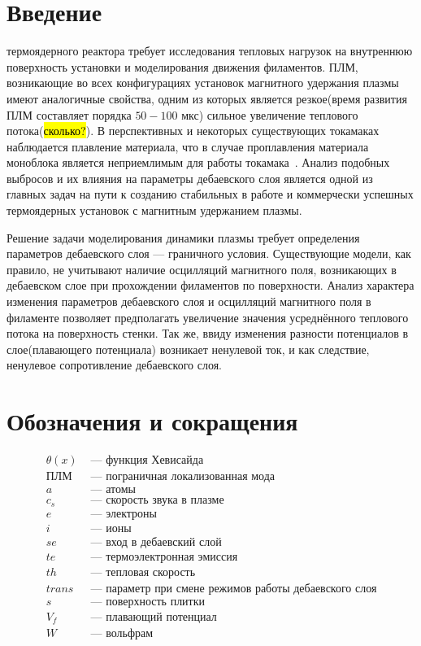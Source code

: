 \section{Введение}
 термоядерного реактора требует исследования тепловых нагрузок на
внутреннюю поверхность установки и моделирования движения филаментов. ПЛМ,
возникающие во всех конфигурациях установок магнитного удержания плазмы имеют
аналогичные свойства, одним из которых является резкое(время развития ПЛМ
составляет порядка $50-100$ мкс) сильное увеличение теплового
потока(\hl{сколько?}). В перспективных и некоторых существующих токамаках
наблюдается плавление материала, что в случае проплавления материала моноблока
является неприемлимым для работы токамака~\cite{gunn2017surface}. Анализ
подобных выбросов и их влияния на параметры дебаевского слоя является одной из
главных задач на пути к созданию стабильных в работе и коммерчески успешных
термоядерных установок с магнитным удержанием плазмы.

Решение задачи моделирования динамики плазмы требует определения параметров
дебаевского слоя --- граничного условия. Существующие модели, как правило, не
учитывают наличие осцилляций магнитного поля, возникающих в дебаевском слое при
прохождении филаментов по поверхности. Анализ характера изменения параметров
дебаевского слоя и осцилляций магнитного поля в филаменте позволяет предполагать
увеличение значения усреднённого теплового потока на поверхность стенки. Так же,
ввиду изменения разности потенциалов в слое(плавающего потенциала) возникает
ненулевой ток, и как следствие, ненулевое сопротивление дебаевского слоя.
\pagebreak

\section{Обозначения и сокращения}
\begin{align*}
	\theta(x) &\text{ --- функция Хевисайда}\\
	\text{ПЛМ} &\text{ --- пограничная локализованная мода}\\
	a &\text{ --- атомы}\\
	c_s &\text{ --- скорость звука в плазме}\\
	e &\text{ --- электроны}\\
	i &\text{ --- ионы}\\
	se &\text{ --- вход в дебаевский слой}\\
	te &\text{ --- термоэлектронная эмиссия}\\
	th &\text { --- тепловая скорость}\\
	trans &\text { --- параметр при смене режимов работы дебаевского слоя}\\
	s &\text{ --- поверхность плитки}\\
	V_f &\text{ --- плавающий потенциал}\\
	W &\text{ --- вольфрам}
\end{align*}
\pagebreak

